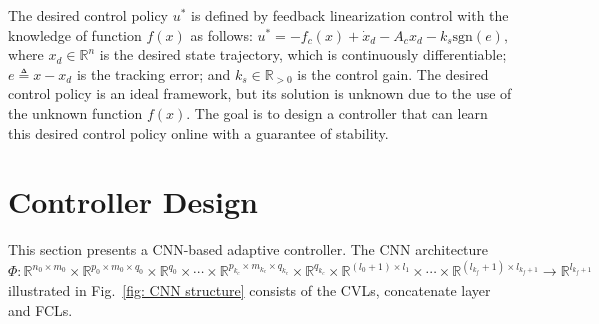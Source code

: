 \documentclass{l4dc2025}
\begin{document}
The desired control policy $u^*$ is defined by feedback linearization control with the knowledge of function $f(x)$ as follows:
$
    u^* = -f_c(x) + \dot x_d - A_c x_d - k_s \text{sgn}(e),
$
where $x_d\in\mathbb{R}^n$ is the desired state trajectory, which is continuously differentiable; $e\triangleq x-x_d$ is the tracking error; and $k_s\in\mathbb{R}_{>0}$ is the control gain.
The desired control policy is an ideal framework, but its solution is unknown due to the use of the unknown function $f(x)$. The goal is to design a controller that can learn this desired control policy online with a guarantee of stability.

\section{Controller Design}\label{label: CNN declare}

This section presents a CNN-based adaptive controller. 
The CNN architecture $\Phi:\mathbb{R}^{n_0\times m_0}\times \mathbb{R}^{p_0\times m_0\times q_0}\times \mathbb{R}^{q_0} \times \cdots \times \mathbb{R}^{p_{k_c}\times m_{k_c}\times q_{k_c}}\times \mathbb{R}^{q_{k_c}}\times \mathbb{R}^{(l_0+1)\times l_1}\times \cdots \times \mathbb{R}^{(l_{k_f}+1)\times l_{k_f+1}} \to \mathbb{R}^{l_{k_f+1}}$ illustrated in Fig.~\ref{fig: CNN structure} consists of the CVLs, concatenate layer and FCLs.
\end{document}
